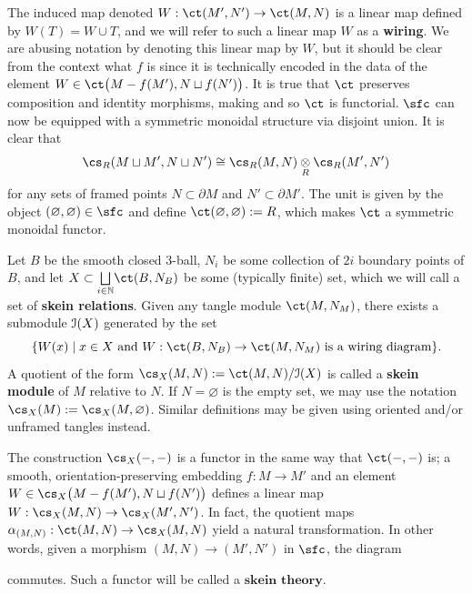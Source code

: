 
The induced map denoted $W: \ct(M', N') \to \ct(M, N)$ is a linear map defined by $W(T) = W \cup T$, and we will refer to such a linear map $W$ as a \textbf{wiring}. We are abusing notation by denoting this linear map by $W$, but it should be clear from the context what $f$ is since it is technically encoded in the data of the element $W \in \ct\big( M-f(M'), N \sqcup f(N') \big)$. It is true that $\ct$ preserves composition and identity morphisms, making and so $\ct$ is functorial. $\sfc$ can now be equipped with a symmetric monoidal structure via disjoint union. It is clear that 
\[\cs_R(M \sqcup M', N \sqcup N') \cong \cs_R(M, N) \underset{R}{\otimes} \cs_R(M', N')\]
for any sets of framed points $N \subset \partial M$ and $N' \subset \partial M'$. The unit is given by the object $(\varnothing, \varnothing) \in \sfc$ and define $\ct(\varnothing, \varnothing) := R$, which makes $\ct$ a symmetric monoidal functor. 

\begin{definition}
Let $B$ be the smooth closed $3$-ball, $N_i$ be some collection of $2i$ boundary points of $B$, and let $X \subset \underset{i \in \N}{\bigsqcup} \ct(B, N_B)$ be some (typically finite) set, which we will call a set of \textbf{skein relations}. Given any tangle module $\ct(M, N_M)$, there exists a submodule $\mathcal{I}(X)$ generated by the set 
\[\{ W(x) \mid x \in X \text{ and } W:\ct(B, N_B) \to \ct(M, N_M) \text{ is a wiring diagram} \}.\] 
A quotient of the form $\cs_X(M, N) := \ct(M, N) / \ci(X)$ is called a \textbf{skein module} of $M$ relative to $N$. If $N = \varnothing$ is the empty set, we may use the notation $\cs_X(M) := \cs_X(M, \varnothing)$. Similar definitions may be given using oriented and/or unframed tangles instead. 
\end{definition}
The construction $\cs_X(-, -)$ is a functor in the same way that $\ct(-, -)$ is; a smooth, orientation-preserving embedding $f: M \to M'$ and an element $W \in \cs_X\big( M-f(M'), N \sqcup f(N') \big)$ defines a linear map $W: \cs_X(M, N) \to \cs_X(M', N')$. In fact, the quotient maps $\alpha_{(M, N)}: \ct(M, N) \to \cs_X(M, N)$ yield a natural transformation. In other words, given a morphism $(M, N) \to (M', N')$ in $\sfc$, the diagram
\begin{center}
\end{center}
commutes. Such a functor will be called a $\textbf{skein theory}$. 

